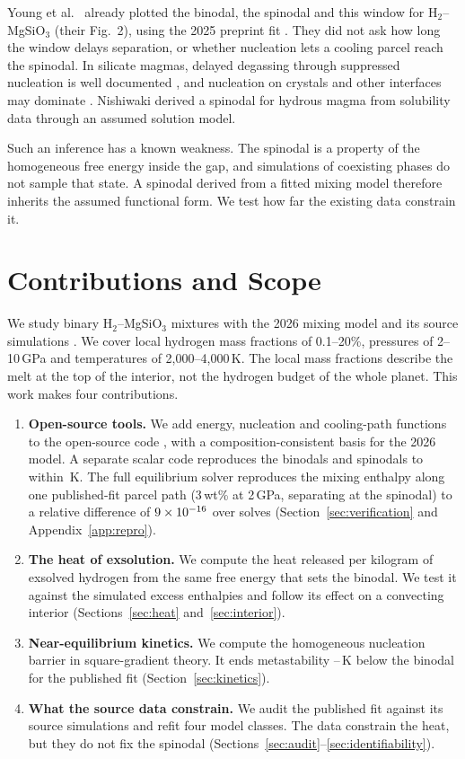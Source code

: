 Young et al.\ \cite{young2025} already plotted the binodal, the spinodal and this window for
H$_2$--MgSiO$_3$ (their Fig.~2), using the 2025 preprint fit \cite{stixrude2025}. They did not ask how
long the window delays separation, or whether nucleation lets a cooling parcel reach the
spinodal. In silicate magmas, delayed degassing through suppressed nucleation is well documented
\cite{mangan2000}, and nucleation on crystals and other interfaces may dominate \cite{shea2017}.
Nishiwaki \cite{nishiwaki2025} derived a spinodal for hydrous magma from solubility data through
an assumed solution model.

Such an inference has a known weakness. The spinodal is a property of the homogeneous free energy
inside the gap, and simulations of coexisting phases do not sample that state. A spinodal
derived from a fitted mixing model therefore inherits the assumed functional form. We test how
far the existing data constrain it.

\section{Contributions and Scope}

We study binary H$_2$--MgSiO$_3$ mixtures with the 2026 mixing model \cite{gilmore2026} and its
source simulations \cite{gilmore2026data}. We cover local hydrogen mass fractions of 0.1--20\%,
pressures of 2--10\,GPa and temperatures of 2,000--4,000\,K. The local mass fractions describe
the melt at the top of the interior, not the hydrogen budget of the whole planet. This work makes
four contributions.
\begin{enumerate}
\item \textbf{Open-source tools.} We add energy, nucleation and cooling-path functions to the
open-source code \Atm{} \cite{bower2025}, with a composition-consistent basis for the 2026
model. A separate scalar code reproduces the \Atm{} binodals and spinodals to within
\indepMaxDiff{}\,K. The full \Atm{} equilibrium solver reproduces the mixing enthalpy along
one published-fit parcel path (3\,wt\% at 2\,GPa, separating at the spinodal) to a relative
difference of $9\times10^{-16}{}$ over \replayRows{} solves (Section~\ref{sec:verification} and
Appendix~\ref{app:repro}).
\item \textbf{The heat of exsolution.} We compute the heat released per kilogram of exsolved
hydrogen from the same free energy that sets the binodal. We test it against the simulated excess
enthalpies and follow its effect on a convecting interior (Sections~\ref{sec:heat}
and~\ref{sec:interior}).
\item \textbf{Near-equilibrium kinetics.} We compute the homogeneous nucleation barrier in
square-gradient theory. It ends metastability \dlyFigOneCPubLo{}--\dlyFigOneCPubHi{}\,K below
the binodal for the published fit (Section~\ref{sec:kinetics}).
\item \textbf{What the source data constrain.} We audit the published fit against its source
simulations and refit four model classes. The data constrain the heat, but they do not fix the
spinodal (Sections~\ref{sec:audit}--\ref{sec:identifiability}).
\end{enumerate}

